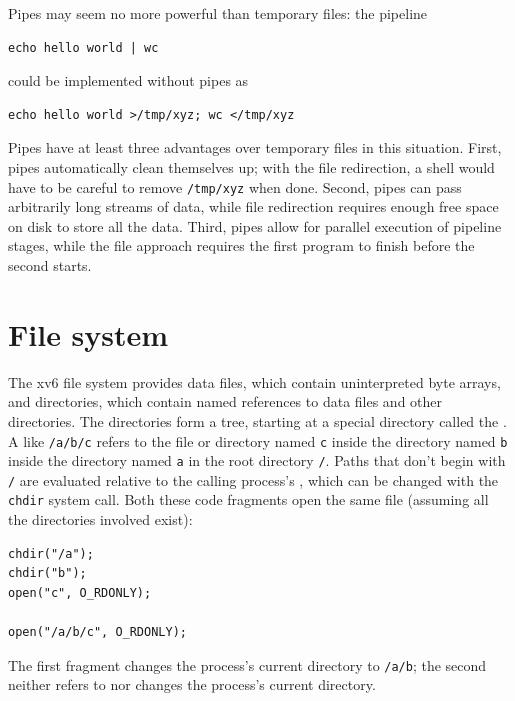 Pipes may seem no more powerful than temporary files:
the pipeline
\begin{lstlisting}[]
echo hello world | wc
\end{lstlisting}
could be implemented without pipes as
\begin{lstlisting}[]
echo hello world >/tmp/xyz; wc </tmp/xyz
\end{lstlisting}
Pipes have at least three advantages over temporary files
in this situation.
First, pipes automatically clean themselves up;
with the file redirection, a shell would have to
be careful to remove
\lstinline{/tmp/xyz}
when done.
Second, pipes can pass arbitrarily long streams of
data, while file redirection requires enough free space
on disk to store all the data.
Third, pipes allow for parallel execution of pipeline stages,
while the file approach requires the first program to finish
before the second starts.
\section{File system}

The xv6 file system provides data files,
which contain uninterpreted byte arrays,
and directories, which
contain named references to data files and other directories.
The directories form a tree, starting
at a special directory called the 
.
A 
like
\lstinline{/a/b/c}
refers to the file or directory named
\lstinline{c}
inside the directory named
\lstinline{b}
inside the directory named
\lstinline{a}
in the root directory
\lstinline{/}.
Paths that don't begin with
\lstinline{/}
are evaluated relative to the calling process's
,
which can be changed with the
\lstinline{chdir}
system call.
Both these code fragments open the same file
(assuming all the directories involved exist):
\begin{lstlisting}[]
chdir("/a");
chdir("b");
open("c", O_RDONLY);

open("/a/b/c", O_RDONLY);
\end{lstlisting}
The first fragment changes the process's current directory to
\lstinline{/a/b};
the second neither refers to nor changes the process's current directory.

